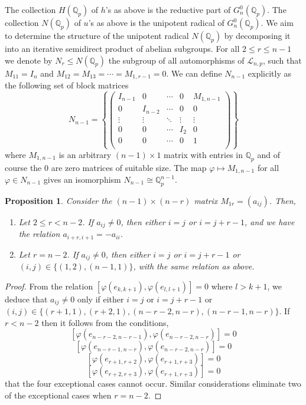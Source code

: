 \documentclass[12pt]{article}
\newtheorem{proposition}[theorem]{Proposition}
\begin{document}
The collection $H(\mathbb{Q}_{p})$ of $h$'s as above is the reductive part of $G_{n}^{0}(\mathbb{Q}_{p})$. The collection $N(\mathbb{Q}_{p})$ of $u$'s as above is the unipotent radical of $G_{n}^{0}(\mathbb{Q}_{p})$. We aim to determine the structure of the unipotent radical $N(\mathbb{Q}_p)$ by decomposing it into an iterative semidirect product of abelian subgroups.
For all $2\leq{r}\leq{n-1}$ we denote by $N_{r}\leq{N(\mathbb{Q}_{p})}$ the subgroup of all automorphisms of $\mathcal{L}_{n,p}$, such that $M_{11}=I_{n}$ and $M_{12}=M_{13}=\cdots=M_{1,r-1}=0$. We can define $N_{n-1}$ explicitly as the following set of block matrices \[
N_{n-1}=\left\{\begin{pmatrix}
I_{n-1} & 0 & \cdots & 0 & M_{1,n-1}\\
0 & I_{n-2} & \cdots & 0 & 0\\
\vdots & \vdots & \ddots & \vdots & \vdots\\
0 & 0 & \cdots & I_{2} & 0\\
0 & 0 & \cdots & 0 & 1\\
\end{pmatrix}\right\}
\]
where $M_{1,n-1}$ is an arbitrary $(n-1)\times{1}$ matrix with entries in $\mathbb{Q}_{p}$ and of course the $0$ are zero matrices of suitable size. The map $\varphi\mapsto{M_{1,n-1}}$ for all $\varphi\in{N_{n-1}}$ gives an isomorphism $N_{n-1}\cong\mathbb{Q}_{p}^{n-1}$.
\begin{proposition}
\label{block.1r.structure}
Consider the $(n-1)\times{(n-r)}$ matrix $M_{1r}=(a_{ij})$. Then,
\begin{enumerate}
    \item Let $2\leq{r}<{n-2}$. If $a_{ij}\neq{0}$, then either $i=j$ or $i=j+r-1$, and we have the relation $a_{i+r,i+1}=-a_{ii}$.
    \item Let $r=n-2$. If $a_{ij}\neq{0}$, then either $i=j$ or $i=j+r-1$ or $(i,j)\in\{(1,2),(n-1,1)\}$, with the same relation as above.
\end{enumerate}
\end{proposition}
\begin{proof}
From the relation $[\varphi(e_{k,k+1}),\varphi(e_{l,l+1})]=0$ where $l>k+1$, we deduce that $a_{ij}\neq{0}$ only if either $i=j$ or $i=j+r-1$ or $(i,j)\in\{(r+1,1),(r+2,1),(n-r-2,n-r),(n-r-1,n-r)\}$. If $r<n-2$ then it follows from the conditions,
\[
[\varphi(e_{n-r-2,n-r-1}),\varphi(e_{n-r-2,n-r})]=0
\]
\[
[\varphi(e_{n-r-1,n-r}),\varphi(e_{n-r-2,n-r})]=0
\]
\[
[\varphi(e_{r+1,r+2}),\varphi(e_{r+1,r+3})]=0
\]
\[
[\varphi(e_{r+2,r+3}),\varphi(e_{r+1,r+3})]=0
\]
that the four exceptional cases cannot occur. Similar considerations eliminate two of the exceptional cases when $r=n-2$.
\end{proof}
\end{document}
